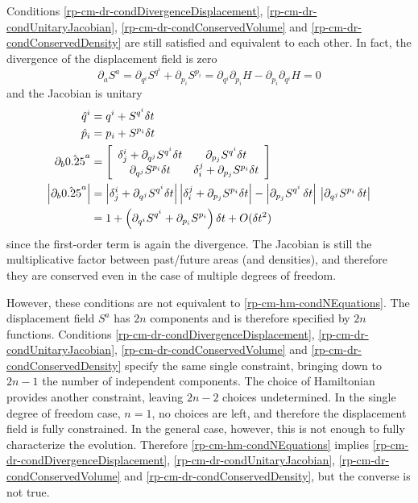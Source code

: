 Conditions \ref{rp-cm-dr-condDivergenceDisplacement}, \ref{rp-cm-dr-condUnitaryJacobian}, \ref{rp-cm-dr-condConservedVolume} and \ref{rp-cm-dr-condConservedDensity} are still satisfied and equivalent to each other. In fact, the divergence of the displacement field is zero
\begin{equation}
	\partial_a S^a = \partial_{q^i} S^{q^i} + \partial_{p_i} S^{p_i} = \partial_{q^i} \partial_{p_i} H - \partial_{p_i} \partial_{q^i} H = 0
\end{equation}
and the Jacobian is unitary
\begin{equation}
	\begin{aligned}
		\hat{q}^i &= q^i + S^{q^i} \delta t \\ 
		\hat{p}_i &= p_i + S^{p_i} \delta t \\ 
		\partial_{b} \hat{\xi}^a &= \left[\begin{array}{ c c }
			\delta_j^i + \partial_{q^j} S^{q^i} \delta t & \partial_{p_j} S^{q^i} \delta t \\
			\partial_{q^j} S^{p_i} \delta t & \delta_i^j + \partial_{p_j} S^{p_i} \delta t \\
		\end{array} \right] \\
		\left|\partial_{b} \hat{\xi}^a\right| &= \left|\delta_j^i + \partial_{q^j} S^{q^i} \delta t\right| \left|\delta_i^j + \partial_{p_j} S^{p_i} \delta t\right| - \left|\partial_{p_j} S^{q^i} \, \delta t \right| \, \left| \partial_{q^j} S^{p_i} \, \delta t \right| \\
		&= 1 + \left(\partial_{q^i} S^{q^i} + \partial_{p_i} S^{p_i} \right) \delta t + O(\delta t^2)
	\end{aligned}
\end{equation}
since the first-order term is again the divergence. The Jacobian is still the multiplicative factor between past/future areas (and densities), and therefore they are conserved even in the case of multiple degrees of freedom.

However, these conditions are not equivalent to \ref{rp-cm-hm-condNEquations}. The displacement field $S^a$ has $2n$ components and is therefore specified by $2n$ functions. Conditions \ref{rp-cm-dr-condDivergenceDisplacement}, \ref{rp-cm-dr-condUnitaryJacobian}, \ref{rp-cm-dr-condConservedVolume} and \ref{rp-cm-dr-condConservedDensity} specify the same single constraint, bringing down to $2n -1$ the number of independent components. The choice of Hamiltonian provides another constraint, leaving $2n - 2$ choices undetermined. In the single degree of freedom case, $n=1$, no choices are left, and therefore the displacement field is fully constrained. In the general case, however, this is not enough to fully characterize the evolution. Therefore \ref{rp-cm-hm-condNEquations} implies \ref{rp-cm-dr-condDivergenceDisplacement}, \ref{rp-cm-dr-condUnitaryJacobian}, \ref{rp-cm-dr-condConservedVolume} and \ref{rp-cm-dr-condConservedDensity}, but the converse is not true.

